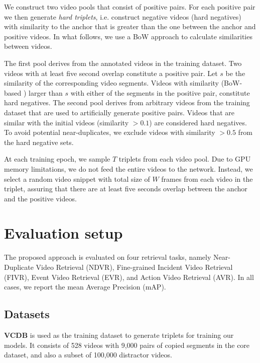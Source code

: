 \documentclass[10pt,twocolumn,letterpaper]{article}
\begin{document}
We construct two video pools that consist of positive pairs. For each positive pair we then generate \textit{hard triplets}, i.e. construct negative videos (hard negatives) with similarity to the anchor that is greater than the one between the anchor and positive videos. In what follows, we use a BoW approach \cite{kordopatis2017a} to calculate similarities between videos. 

The first pool derives from the annotated videos in the training dataset. Two videos with at least five second overlap constitute a positive pair. Let $s$ be the similarity of the corresponding video segments. Videos with similarity (BoW-based \cite{kordopatis2017a}) larger than $s$ with either of the segments in the positive pair, constitute hard negatives. The second pool derives from arbitrary videos from the training dataset that are used to artificially generate positive pairs. Videos that are similar with the initial videos (similarity $>0.1$) are considered  hard negatives. To avoid potential near-duplicates, we exclude videos with similarity $>0.5$ from the hard negative sets.

At each training epoch, we sample $T$ triplets from each video pool. Due to GPU memory limitations, we do not feed the entire videos to the network. Instead, we select a random video snippet with total size of $W$ frames from each video in the triplet, assuring that there are at least five seconds overlap between the anchor and the positive videos.








\section{Evaluation setup}
\label{sec:experiments}

The proposed approach is evaluated on four retrieval tasks, namely Near-Duplicate Video Retrieval (NDVR), Fine-grained Incident Video Retrieval (FIVR), Event Video Retrieval (EVR), and Action Video Retrieval (AVR). In all cases, we report the mean Average Precision (mAP).

\subsection{Datasets}
\label{sec:datasets}

\textbf{VCDB} \cite{jiang2014} is used as the training dataset to generate triplets for training our models. It consists of 528 videos with 9,000 pairs of copied segments in the core dataset, and also a subset of 100,000 distractor videos.
\end{document}
